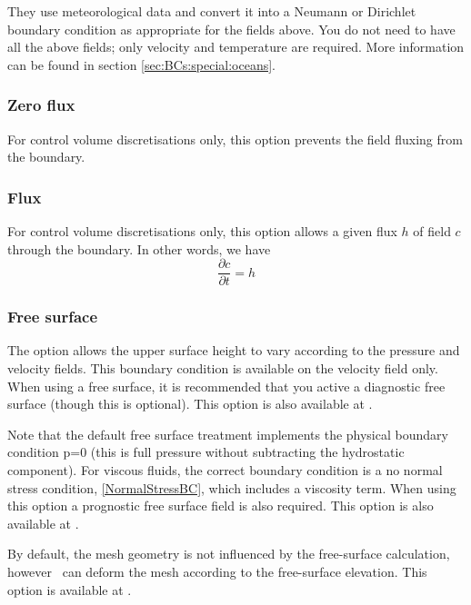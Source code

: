 They use meteorological data and convert it into a Neumann or Dirichlet boundary condition
as appropriate for the fields above. You do not need to have all the above fields; only 
velocity and temperature are required. More information can be found in section \ref{sec:BCs:special:oceans}.

\subsubsection{Zero flux}

For control volume discretisations only, this option prevents the field fluxing from the boundary.

\subsubsection{Flux}

For control volume discretisations only, this option allows a given flux $h$ of field $c$ through the boundary. In other words, we have
\begin{equation*}
   \frac{\partial c}{\partial t} = h
\end{equation*}

\subsubsection{Free surface}\label{subsec:free_surface_bc}

The  option allows the upper surface height to vary according to the pressure and velocity fields. This boundary condition is available on the velocity field only. When using a free surface, it is recommended that you active a diagnostic free surface (though this is optional). This option is also available at . 

Note that the default free surface treatment implements the physical boundary
condition p=0 (this is full pressure without subtracting the hydrostatic
component). For viscous fluids, the correct boundary condition is a no normal
stress condition, \eqref{NormalStressBC}, which includes a viscosity term. When using this option a prognostic free surface field is also required. This option is also available at . 

By default, the mesh geometry is not influenced by the free-surface calculation, however \fluidity\ can deform the mesh according to the free-surface elevation. 
This option is available at .

